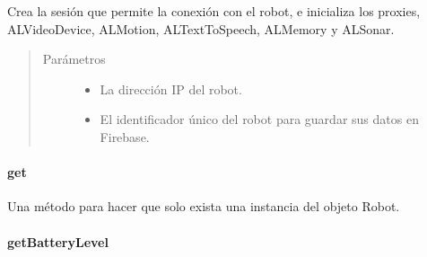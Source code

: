 \begin{fulllineitems}
\label{\detokenize{dev_docs:com.lar.cloudnao.Robot.createSessionAndProxies(String, String)}}
Crea la sesión que permite la conexión con el robot, e inicializa los proxies, ALVideoDevice, ALMotion, ALTextToSpeech, ALMemory y ALSonar.
\begin{quote}\begin{description}
\item[{Parámetros}] \leavevmode\begin{itemize}
\item {} 
 \textendash{} La dirección IP del robot.

\item {} 
 \textendash{} El identificador único del robot para guardar sus datos en Firebase.

\end{itemize}

\end{description}\end{quote}

\end{fulllineitems}



\paragraph{get}
\label{\detokenize{dev_docs:get}}

\begin{fulllineitems}
\label{\detokenize{dev_docs:com.lar.cloudnao.Robot.get(Context)}}
Una método para hacer que solo exista una instancia del objeto Robot.

\end{fulllineitems}



\paragraph{getBatteryLevel}
\label{\detokenize{dev_docs:getbatterylevel}}

